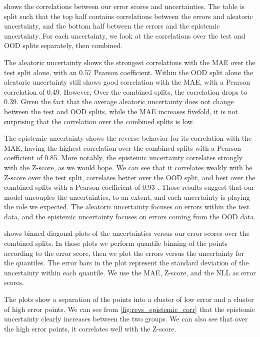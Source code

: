  shows the correlations between our error scores and uncertainties. The table is split such that the top half contains correlations between the errors and aleatoric uncertainty, and the bottom half between the errors and the epistemic uncertainty. For each uncertainty, we look at the correlations over the test and OOD splits separately, then combined.  

The aleatoric uncertainty shows the strongest correlations with the MAE over the test split alone, with an 0.57 Pearson coefficient. Within the OOD split alone the aleatoric uncertainty still shows good correlation with the MAE, with a Pearson correlation of 0.49. However, Over the combined splits, the correlation drops to 0.39. Given the fact that the average aleatoric uncertainty does not change between the test and OOD splits, while the MAE increases fivefold, it is not surprising that the correlation over the combined splits is low.

The epistemic uncertainty shows the reverse behavior for its correlation with the MAE, having the highest correlation over the combined splits with a Pearson coefficient of 0.85.  More notably, the epistemic uncertainty correlates strongly with the Z-score, as we would hope. We can see that it correlates weakly with he Z-score over the test split, correlates better over the OOD split, and best over the combined splits with a Pearson coefficient of 0.93 . 
Those results suggest that our model uncouples the uncertainties, to an extent, and each uncertainty is playing the role we expected. The aleatoric uncertainty focuses on errors within the test data, and the epistemic uncertainty focuses on errors coming from the OOD data. 

 shows binned diagonal plots of the uncertainties versus our error scores over the combined splits. In those plots we perform quantile binning of the points according to the error score, then we plot the errors versus the uncertainty for the quantiles. The error bars in the plot represent the standard deviation of the uncertainty within each quantile. We use the MAE, Z-score, and the NLL as error scores. 

The plots show a separation of the points into a cluster of low error and a cluster of high error points. We can see from \cref{fig:revs_epistemic_corr} that the epistemic uncertainty clearly increases between the two groups. We can also see that over the high error points, it correlates well with the Z-score. 

